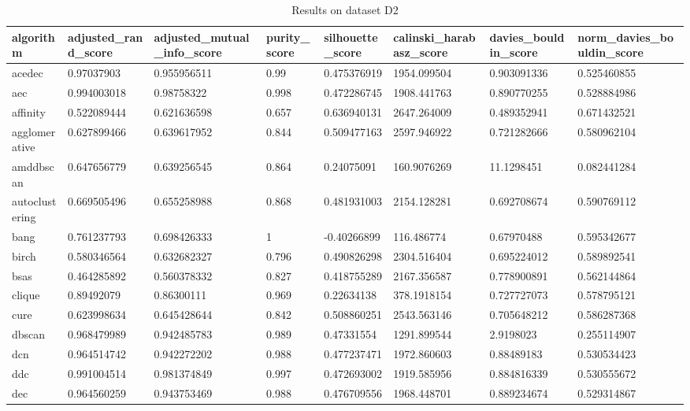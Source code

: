\begin{table}[H]
\centering
\caption{Results on dataset D2}
\label{tab:params:D2}
\begin{tabular}{|l|l|l|l|l|l|l|l|}
\hline
algorithm & adjusted\_rand\_score & adjusted\_mutual\_info\_score & purity\_score & silhouette\_score & calinski\_harabasz\_score & davies\_bouldin\_score & norm\_davies\_bouldin\_score \\
\hline
acedec & 0.97037903 & 0.955956511 & 0.99 & 0.475376919 & 1954.099504 & 0.903091336 & 0.525460855 \\
\hline
aec & 0.994003018 & 0.98758322 & 0.998 & 0.472286745 & 1908.441763 & 0.890770255 & 0.528884986 \\
\hline
affinity & 0.522089444 & 0.621636598 & 0.657 & 0.636940131 & 2647.264009 & 0.489352941 & 0.671432521 \\
\hline
agglomerative & 0.627899466 & 0.639617952 & 0.844 & 0.509477163 & 2597.946922 & 0.721282666 & 0.580962104 \\
\hline
amddbscan & 0.647656779 & 0.639256545 & 0.864 & 0.24075091 & 160.9076269 & 11.1298451 & 0.082441284 \\
\hline
autoclustering & 0.669505496 & 0.655258988 & 0.868 & 0.481931003 & 2154.128281 & 0.692708674 & 0.590769112 \\
\hline
bang & 0.761237793 & 0.698426333 & 1 & -0.40266899 & 116.486774 & 0.67970488 & 0.595342677 \\
\hline
birch & 0.580346564 & 0.632682327 & 0.796 & 0.490826298 & 2304.516404 & 0.695224012 & 0.589892541 \\
\hline
bsas & 0.464285892 & 0.560378332 & 0.827 & 0.418755289 & 2167.356587 & 0.778900891 & 0.562144864 \\
\hline
clique & 0.89492079 & 0.86300111 & 0.969 & 0.22634138 & 378.1918154 & 0.727727073 & 0.578795121 \\
\hline
cure & 0.623998634 & 0.645428644 & 0.842 & 0.508860251 & 2543.563146 & 0.705648212 & 0.586287368 \\
\hline
dbscan & 0.968479989 & 0.942485783 & 0.989 & 0.47331554 & 1291.899544 & 2.9198023 & 0.255114907 \\
\hline
dcn & 0.964514742 & 0.942272202 & 0.988 & 0.477237471 & 1972.860603 & 0.88489183 & 0.530534423 \\
\hline
ddc & 0.991004514 & 0.981374849 & 0.997 & 0.472693002 & 1919.585956 & 0.884816339 & 0.530555672 \\
\hline
dec & 0.964560259 & 0.943753469 & 0.988 & 0.476709556 & 1968.448701 & 0.889234674 & 0.529314867 \\

\end{tabular}
\end{table}
